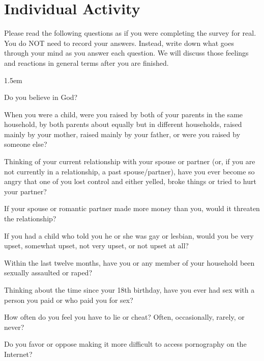 \documentclass[a4, 12pt]{article}
\begin{document}
\pagebreak

\section*{Individual Activity}

\noindent Please read the following questions as if you were completing the survey for real. You do NOT need to record your answers. Instead, write down what goes through your mind as you answer each question. We will discuss those feelings and reactions in general terms after you are finished.

\begin{itemize*}\itemsep1.5em
	\item Do you believe in God?
	\item When you were a child, were you raised by both of your parents in the same household, by both parents about equally but in different households, raised mainly by your mother, raised mainly by your father, or were you raised by someone else?
	\item Thinking of your current relationship with your spouse or partner (or, if you are not currently in a relationship, a past spouse/partner), have you ever become so angry that one of you lost control and either yelled, broke things or tried to hurt your partner?
	\item If your spouse or romantic partner made more money than you, would it threaten the relationship?
	\item If you had a child who told you he or she was gay or lesbian, would you be very upset, somewhat upset, not very upset, or not upset at all?
	\item Within the last twelve months, have you or any member of your household been sexually assaulted or raped?
	\item Thinking about the time since your 18th birthday, have you ever had sex with a person you paid or who paid you for sex?
	\item How often do you feel you have to lie or cheat? Often, occasionally, rarely, or never?
	\item Do you favor or oppose making it more difficult to access pornography on the Internet?

\end{itemize*}
\end{document}
